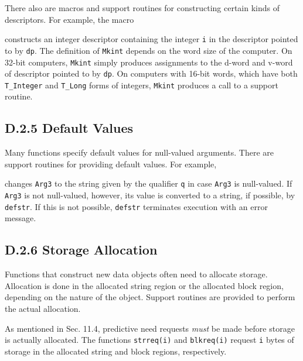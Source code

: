 There also are macros and support routines for constructing certain
kinds of descriptors. For example, the macro


\noindent
constructs an integer descriptor containing the integer \texttt{i} in the
descriptor pointed to by \texttt{dp}. The definition of \texttt{\color{red}Mkint}
depends on the word size of the computer. On 32-bit computers,
\texttt{\color{red}Mkint} simply produces assignments to the d-word and v-word of
descriptor pointed to by \texttt{dp}. On computers with 16-bit words, which
have both \texttt{T\_Integer} and \texttt{T\_Long} forms of integers,
\texttt{\color{red}Mkint} produces a call to a support routine.

\subsection[D.2.5 Default Values]{D.2.5 Default Values}

Many functions specify default values for null-valued arguments. There
are support routines for providing default values. For example,



\noindent
changes \texttt{Arg3} to the string given by the qualifier \texttt{q} in
case \texttt{Arg3} is null-valued. If \texttt{Arg3} is not null-valued,
however, its value is converted to a string, if possible, by
\texttt{\color{red}defstr}. If this is not possible, \texttt{\color{red}defstr} terminates
execution with an error message.

\subsection[D.2.6 Storage Allocation]{D.2.6 Storage Allocation}

Functions that construct new data objects often need to allocate
storage. Allocation is done in the allocated string region or the
allocated block region, depending on the nature of the object. Support
routines are provided to perform the actual allocation.

As mentioned in Sec. 11.4, predictive need requests \textit{must} be made
before storage is actually allocated. The functions \texttt{strreq(i)} and
\texttt{blkreq(i)} request \texttt{i} bytes of storage in the allocated
string and block regions, respectively.

